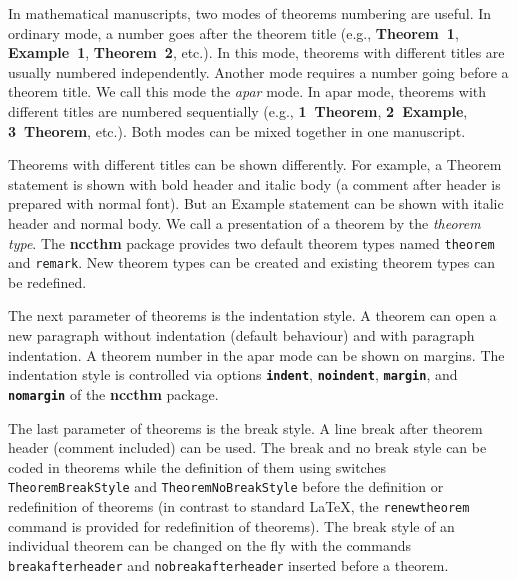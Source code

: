 \documentclass[11pt]{ncc}
\newcommand*\package[1]{\textbf{#1}}
\newcommand*\Opt[1]{\texttt{\textbf{#1}}}
\newcommand*\Meta[1]{\texttt{\upshape#1}}
\newcommand*\com[1]{\Meta{\symbol{"5C}#1}}
\begin{document}
In mathematical manuscripts, two modes of theorems numbering are
useful. In ordinary mode, a number goes after the theorem title
(e.g., \textbf{Theorem~1}, \textbf{Example~1},
\textbf{Theorem~2}, etc.). In this mode, theorems with different
titles are usually numbered independently. Another mode requires
a number going before a theorem title. We call this mode the
\textit{apar} mode. In apar mode, theorems with different titles
are numbered sequentially (e.g., \textbf{1~Theorem},
\textbf{2~Example}, \textbf{3~Theorem}, etc.). Both modes can be
mixed together in one manuscript.

Theorems with different titles can be shown differently. For
example, a Theorem statement is shown with bold header and italic
body (a comment after header is prepared with normal font). But
an Example statement can be shown with italic header and normal
body. We call a presentation of a theorem by the \textit{theorem
type}. The \package{nccthm} package provides two default theorem
types named \texttt{theorem} and \texttt{remark}. New theorem
types can be created and existing theorem types can be redefined.

The next parameter of theorems is the indentation style. A
theorem can open a new paragraph without indentation (default
behaviour) and with paragraph indentation. A theorem number in the
apar mode can be shown on margins. The indentation style is
controlled via options \Opt{indent}, \Opt{noindent},
\Opt{margin}, and \Opt{nomargin} of the \package{nccthm} package.

The last parameter of theorems is the break style. A line break
after theorem header (comment included) can be used. The break and
no break style can be coded in theorems while the definition of
them using switches \com{TheoremBreakStyle} and
\com{TheoremNoBreakStyle} before the definition or redefinition
of theorems (in contrast to standard \LaTeX, the
\com{renewtheorem} command is provided for redefinition of
theorems). The break style of an individual theorem can be changed
on the fly with the commands \com{breakafterheader} and
\com{nobreakafterheader} inserted before a theorem.
\end{document}
